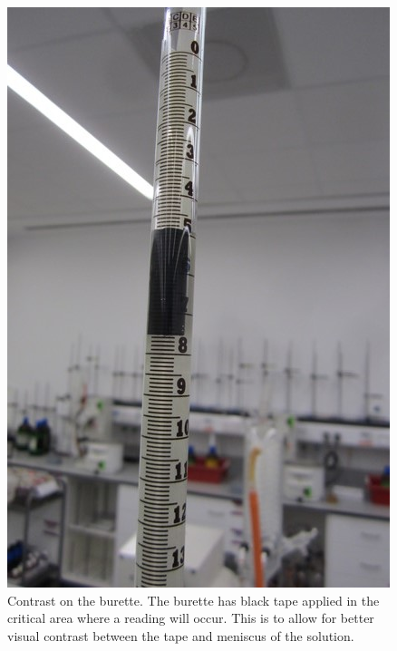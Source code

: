 \documentclass[11.5pt]{sig-alternate} %
\begin{document}
\begin{large}
\begin{figure}[htbp]
    \centering
    \includegraphics[width=\columnwidth]{images/fig8.jpeg}
    \caption{Contrast on the burette. The burette has black tape applied in the critical area where a reading will occur. This is to allow for better visual contrast between the tape and meniscus of the solution.}
    \label{Figure 8}
\end{figure}


\end{large}
\end{document}
